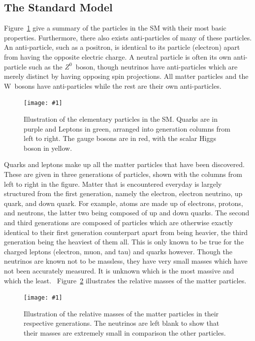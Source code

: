 \documentclass[twocolumn]{article}
\newcommand{\insertFigure}[1]{%
   \texttt{[image: \#1]}%
}
\begin{document}
\subsection{The Standard Model}
Figure~\ref{fig:part} give a summary of the particles in the SM with their most basic properties. Furthermore, there also exists anti-particles of many of these particles. An anti-particle, such as a positron, is identical to its particle (electron) apart from having the opposite electric charge. A neutral particle is often its own anti-particle such as the $Z^0$~boson, though neutrinos have anti-particles which are merely distinct by having opposing spin projections. All matter particles and the W~bosons have anti-particles while the rest are their own anti-particles.
\begin{figure}[!h]
	\centering
	\insertFigure{Images/SM.png}
	\caption{Illustration of the elementary particles in the SM. Quarks are in purple and Leptons in green, arranged into generation columns from left to right. The gauge bosons are in red, with the scalar Higgs boson in yellow.~\cite{part}}
	\label{fig:part}
\end{figure}
Quarks and leptons make up all the matter particles that have been discovered. These are given in three generations of particles, shown with the columns from left to right in the figure. Matter that is encountered everyday is largely structured from the first generation, namely the electron, electron neutrino, up quark, and down quark. For example, atoms are made up of electrons, protons, and neutrons, the latter two being composed of up and down quarks. The second and third generations are composed of particles which are otherwise exactly identical to their first generation counterpart apart from being heavier, the third generation being the heaviest of them all. This is only known to be true for the charged leptons (electron, muon, and tau) and quarks however. Though the neutrinos are known not to be massless, they have very small masses which have not been accurately measured. It is unknown which is the most massive and which the least.~\cite{Thompson} Figure~\ref{fig:mass} illustrates the relative masses of the matter particles.
\begin{figure}[!h]
	\centering
	\insertFigure{Images/mass.png}
	\caption{Illustration of the relative masses of the matter particles in their respective generations. The neutrinos are left blank to show that their masses are extremely small in comparison the other particles.~\cite{Thompson}}
	\label{fig:mass}
\end{figure}
\end{document}
